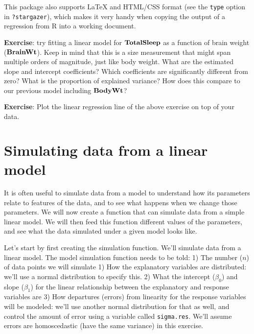 \documentclass[
]{book}
\begin{document}
This package also supports LaTeX and HTML/CSS format (see the \texttt{type} option in \texttt{?stargazer}), which makes it very handy when copying the output of a regression from R into a working document.

\textbf{Exercise}: try fitting a linear model for \(\bf{TotalSleep}\) as a function of brain weight (\(\bf{BrainWt}\)). Keep in mind that this is a size measurement that might span multiple orders of magnitude, just like body weight. What are the estimated slope and intercept coefficients? Which coefficients are significantly different from zero? What is the proportion of explained variance? How does this compare to our previous model including \(\bf{BodyWt}\)?

\textbf{Exercise}: Plot the linear regression line of the above exercise on top of your data.

\hypertarget{simulating-data-from-a-linear-model-1}{%
\section{Simulating data from a linear model}\label{simulating-data-from-a-linear-model-1}}

It is often useful to simulate data from a model to understand how its parameters relate to features of the data, and to see what happens when we change those parameters. We will now create a function that can simulate data from a simple linear model. We will then feed this function different values of the parameters, and see what the data simulated under a given model looks like.

Let's start by first creating the simulation function. We'll simulate data from a linear model. The model simulation function needs to be told:
1) The number (\(n\)) of data points we will simulate
1) How the explanatory variables are distributed: we'll use a normal distribution to specify this.
2) What the intercept (\(\beta_0\)) and slope (\(\beta_1\)) for the linear relationship between the explanatory and response variables are
3) How departures (errors) from linearity for the response variables will be modeled: we'll use another normal distribution for that as well, and control the amount of error using a variable called \texttt{sigma.res}. We'll assume errors are homoscedastic (have the same variance) in this exercise.
\end{document}
